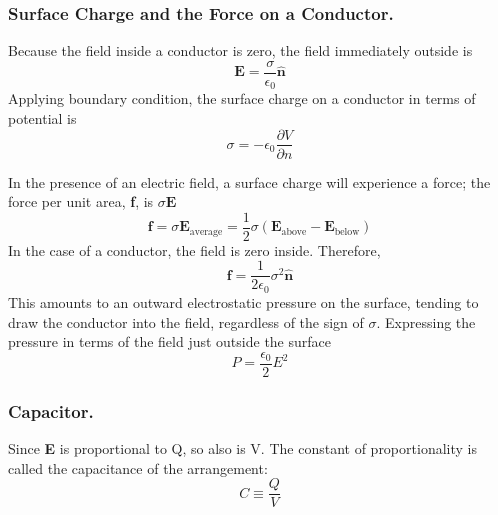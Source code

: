 \documentclass[../../../main.tex]{subfiles}
\begin{document}
\subsubsection*{Surface Charge and the Force on a Conductor.} 
Because the field inside a conductor is zero, 
the field immediately outside is
\begin{equation*}
    \mathbf{E}=\frac{\sigma}{\epsilon_0}\mathbf{\hat{n}}
\end{equation*}
Applying boundary condition, the surface charge on a conductor in
terms of potential is
\begin{equation*}
    \sigma=-\epsilon_0\frac{\partial V}{\partial n}
\end{equation*}

In the presence of an electric field, a surface charge will experience a force; the force per unit area, \textbf{f}, is $\sigma\mathbf{E}$
\begin{equation*}
    \mathbf{f}=\sigma\mathbf{E}_{\text{average}}=\frac{1}{2}\sigma(\mathbf{E}_{\text{above}}-\mathbf{E}_{\text{below}})
\end{equation*}
In the case of a conductor, the field is zero inside. Therefore,
    \begin{equation*}
        \mathbf{f}=\frac{1}{2\epsilon_0}\sigma^2\mathbf{\hat{n}}
    \end{equation*} 
This amounts to an outward electrostatic pressure on the surface, tending to draw the conductor into the field, regardless of the sign of $\sigma$. Expressing the pressure in terms of the field just outside the surface
\begin{equation*}
    P=\frac{\epsilon_0}{2}E^2
\end{equation*}

\subsubsection*{Capacitor.}
Since \textbf{E} is proportional to Q, so also is V. The constant of proportionality is called the capacitance of the arrangement:
\begin{equation*}
    C\equiv \frac{Q}{V}
\end{equation*}
\end{document}
